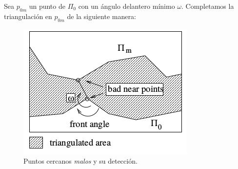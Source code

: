 Sea $p_{0m}$ un punto de $\Pi_0$  con un ángulo delantero mínimo $\omega$. Completamos la triangulación en $p_{0m}$ de la siguiente manera:
\begin{figure}[h]
\centering
\includegraphics[scale=0.5]{images/hartmann4.png}
\caption{Puntos cercanos \textit{malos} y su detección.}
\end{figure}
\newpage
